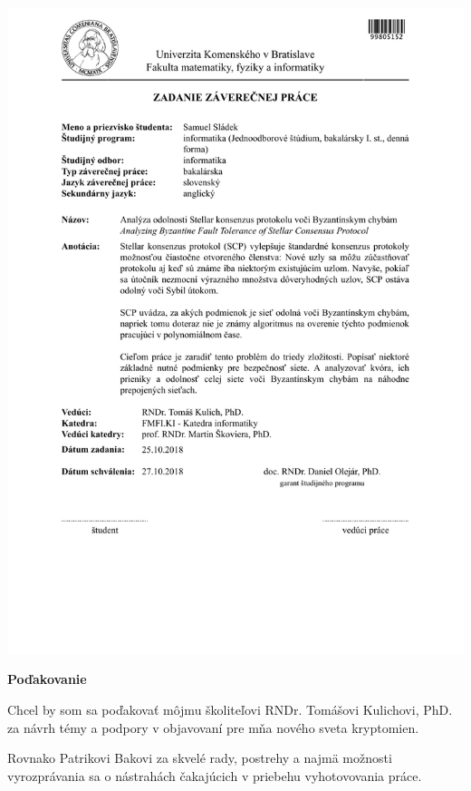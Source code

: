\documentclass[12pt, twoside]{book}
\begin{document}
\newpage
\thispagestyle{empty}
\hspace{-2cm}\includegraphics[width=1.1\textwidth]{images/zadanie}


\frontmatter

\setcounter{page}{5}
\newpage

\begin{flushleft}\textbf{\Large Poďakovanie}\end{flushleft}
Chcel by som sa poďakovať môjmu školiteľovi RNDr. Tomášovi Kulichovi, PhD.
za návrh témy a podpory v objavovaní pre mňa nového sveta kryptomien.

Rovnako Patrikovi Bakovi za skvelé rady, postrehy a najmä možnosti
vyrozprávania sa o nástrahách čakajúcich v priebehu vyhotovovania práce.
\end{document}
